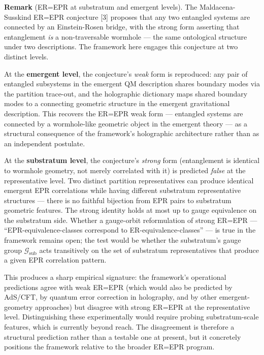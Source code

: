 \documentclass[
]{article}
\begin{document}
\textbf{Remark} (ER=EPR at substratum and emergent levels). The
Maldacena-Susskind ER=EPR conjecture {[}3{]} proposes that any two
entangled systems are connected by an Einstein-Rosen bridge, with the
strong form asserting that entanglement \emph{is} a non-traversable
wormhole --- the same ontological structure under two descriptions. The
framework here engages this conjecture at two distinct levels.

At the \textbf{emergent level}, the conjecture's \emph{weak} form is
reproduced: any pair of entangled subsystems in the emergent QM
description shares boundary modes via the partition trace-out, and the
holographic dictionary maps shared boundary modes to a connecting
geometric structure in the emergent gravitational description. This
recovers the ER=EPR weak form --- entangled systems are connected by a
wormhole-like geometric object in the emergent theory --- as a
structural consequence of the framework's holographic architecture
rather than as an independent postulate.

At the \textbf{substratum level}, the conjecture's \emph{strong} form
(entanglement is identical to wormhole geometry, not merely correlated
with it) is predicted \emph{false} at the representative level. Two
distinct partition representatives can produce identical emergent EPR
correlations while having different substratum representative structures
--- there is no faithful bijection from EPR pairs to substratum
geometric features. The strong identity holds at most up to gauge
equivalence on the substratum side. Whether a gauge-orbit reformulation
of strong ER=EPR --- ``EPR-equivalence-classes correspond to
ER-equivalence-classes'' --- is true in the framework remains open; the
test would be whether the substratum's gauge group
\(\mathcal{G}_{\text{sub}}\) acts transitively on the set of substratum
representatives that produce a given EPR correlation pattern.

This produces a sharp empirical signature: the framework's operational
predictions agree with weak ER=EPR (which would also be predicted by
AdS/CFT, by quantum error correction in holography, and by other
emergent-geometry approaches) but disagree with strong ER=EPR at the
representative level. Distinguishing these experimentally would require
probing substratum-scale features, which is currently beyond reach. The
disagreement is therefore a structural prediction rather than a testable
one at present, but it concretely positions the framework relative to
the broader ER=EPR program.
\end{document}
